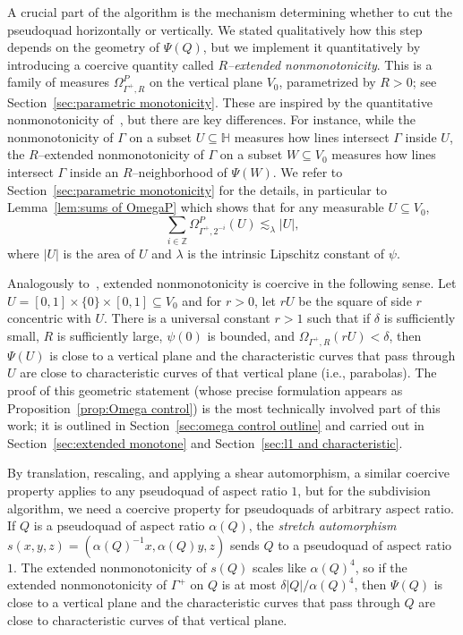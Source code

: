 \documentclass[11pt,reqno]{amsart}
\renewcommand{\H}{\mathbb{H}}
\newcommand{\Z}{\mathbb{Z}}
\newcommand{\0}{\mathbf{0}}
\renewcommand{\1}{\mathbf 1}
\renewcommand{\subset}{\subseteq}
\theoremstyle{remark}
\begin{document}
A crucial part of the algorithm is the mechanism determining whether to cut the  pseudoquad horizontally or vertically.  We stated qualitatively how this step depends on the geometry of $\Psi(Q)$, but we implement it quantitatively by introducing a coercive quantity called \emph{$R$--extended nonmonotonicity}.  This is a family of measures $\Omega^P_{\Gamma^+,R}$ on the vertical plane $V_0$, parametrized by  $R>0$; see Section~\ref{sec:parametric monotonicity}. These are inspired by the quantitative nonmonotonicity of~\cite{CKN}, but there are key differences. For instance, while the nonmonotonicity of $\Gamma$ on a subset $U\subset \H$ measures how lines intersect $\Gamma$ inside $U$, the $R$--extended nonmonotonicity of $\Gamma$ on a subset $W\subset V_0$ measures how lines intersect $\Gamma$ inside an $R$--neighborhood of $\Psi(W)$.
We refer to Section~\ref{sec:parametric monotonicity} for the details, in particular to Lemma~\ref{lem:sums of OmegaP} which shows that for any measurable $U\subset V_0$,
\begin{equation}\label{eq:kinematic intro}
    \sum_{i\in \Z} \Omega^P_{\Gamma^+,2^{-i}}(U)\lesssim_{\lambda} |U|,
\end{equation}
where $|U|$ is the area of $U$ and $\lambda$ is the intrinsic Lipschitz constant of $\psi$.

Analogously to~\cite{CKN}, extended nonmonotonicity is coercive in the following sense.  Let $U=[0,1]\times\{0\}\times [0,1]\subset V_0$ and for $r>0$, let $rU$ be the square of side $r$ concentric with $U$.  There is a universal constant $r>1$ such that if $\delta$ is sufficiently small, $R$ is sufficiently large, $\psi(0)$ is bounded, and $\Omega_{\Gamma^+,R}(rU)<\delta$, then $\Psi(U)$ is close to a vertical plane and the characteristic curves that pass through $U$ are close to characteristic curves of that vertical plane (i.e., parabolas).  The proof of this geometric statement (whose precise formulation appears as Proposition~\ref{prop:Omega control})  is the most technically involved part of this work; it is outlined in Section~\ref{sec:omega control outline} and carried out in Section~\ref{sec:extended monotone} and Section~\ref{sec:l1 and characteristic}.

By translation, rescaling, and applying a shear automorphism, a similar coercive property applies to any pseudoquad of aspect ratio $1$, but for the subdivision algorithm, we need a coercive property for pseudoquads of arbitrary aspect ratio.  If $Q$ is a pseudoquad of aspect ratio $\alpha(Q)$, the \emph{stretch automorphism} $s(x,y,z)=(\alpha(Q)^{-1}x, \alpha(Q) y, z)$ sends $Q$ to a pseudoquad of aspect ratio $1$.  The extended nonmonotonicity of $s(Q)$ scales like $\alpha(Q)^4$, so if the extended nonmonotonicity of $\Gamma^+$ on $Q$ is at most $\delta |Q|/\alpha(Q)^{4}$, then $\Psi(Q)$ is close to a vertical plane and the characteristic curves that pass through $Q$ are close to characteristic curves of that vertical plane.
\end{document}
